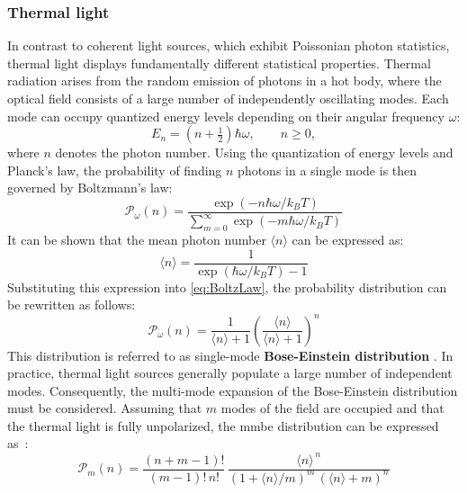 \subsubsection{Thermal light}
In contrast to coherent light sources, which exhibit Poissonian photon statistics, thermal light displays fundamentally different statistical properties. Thermal radiation arises from the random emission of photons in a hot body, where the optical field consists of a large number of independently oscillating modes. Each mode can occupy quantized energy levels depending on their angular frequency $\omega$: 
\begin{equation}
	E_n = \left(n + \tfrac{1}{2}\right)\hbar \omega, 
	\qquad n \geq 0,
\end{equation}
where $n$ denotes the photon number. \newline
Using the quantization of energy levels and Planck's law,
the probability of finding $n$ photons in a single mode is then governed by Boltzmann’s law:
\begin{equation}
	\mathcal{P}_{\omega}(n) = \frac{\exp\!\left(-n\hbar\omega / k_B T\right)}
	{\sum_{m=0}^{\infty} \exp\!\left(-m\hbar\omega / k_B T\right)}
	\label{eq:BoltzLaw}
\end{equation}
It can be shown that the mean photon number $\langle n\rangle$ can be expressed as:
\begin{equation}
	\langle n\rangle = \frac{1}{\exp\!\left(\hbar\omega / k_B T\right) -1}
\end{equation}
Substituting this expression into \autoref{eq:BoltzLaw}, the probability distribution can be rewritten as follows:
\begin{equation}
	\mathcal{P}_{\omega}(n) = \frac{1}{\langle n\rangle+1}\left(\frac{\langle n\rangle}{\langle n\rangle+1}\right)^n
	\label{eq:smBE}
\end{equation}
This distribution is referred to as single-mode \textbf{Bose-Einstein distribution} \cite{foxQuantumOpticsIntroduction2006}. \newline
In practice, thermal light sources generally populate a large number of independent modes. Consequently, the multi-mode expansion of the Bose-Einstein distribution must be considered. Assuming that $m$ modes of the field are occupied and that the thermal light is fully unpolarized, the \acrfull{mmbe} distribution can be expressed as~\cite{mandelOpticalCoherenceQuantum1995}:
\begin{equation}
	\mathcal{P}_m(n) = \frac{(n+m-1)!}{(m-1)!\,n!}\,
	\frac{\langle n\rangle^{\,n}}{\left(1+\langle n\rangle/m\right)^{m}\,\left(\langle n\rangle+m\right)^{n}} 
	\label{eq:mmBE}
\end{equation}
